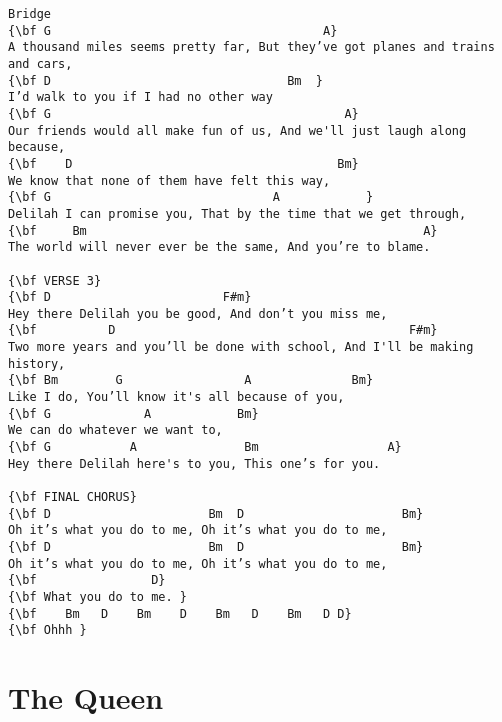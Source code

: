 \documentclass[a4paper]{article}
\begin{document}
\begin{Verbatim}[commandchars=\\\{\}]
Bridge
{\bf G                                      A}
A thousand miles seems pretty far, But they’ve got planes and trains and cars, 
{\bf D                                 Bm  }
I’d walk to you if I had no other way 
{\bf G                                         A}
Our friends would all make fun of us, And we'll just laugh along because, 
{\bf    D                                     Bm}
We know that none of them have felt this way, 
{\bf G                               A            }
Delilah I can promise you, That by the time that we get through, 
{\bf     Bm                                               A}
The world will never ever be the same, And you’re to blame. 

{\bf VERSE 3}
{\bf D                        F#m}
Hey there Delilah you be good, And don’t you miss me, 
{\bf          D                                         F#m}
Two more years and you’ll be done with school, And I'll be making history, 
{\bf Bm        G                 A              Bm}
Like I do, You’ll know it's all because of you, 
{\bf G             A            Bm}
We can do whatever we want to, 
{\bf G           A               Bm                  A}
Hey there Delilah here's to you, This one’s for you. 

{\bf FINAL CHORUS}
{\bf D                      Bm  D                      Bm}
Oh it’s what you do to me, Oh it’s what you do to me, 
{\bf D                      Bm  D                      Bm}
Oh it’s what you do to me, Oh it’s what you do to me, 
{\bf                D}
{\bf What you do to me. }
{\bf    Bm   D    Bm    D    Bm   D    Bm   D D}
{\bf Ohhh }
\end{Verbatim}
\newpage
\section{The Queen} %
\label{sec:The Quee}
\end{document}
